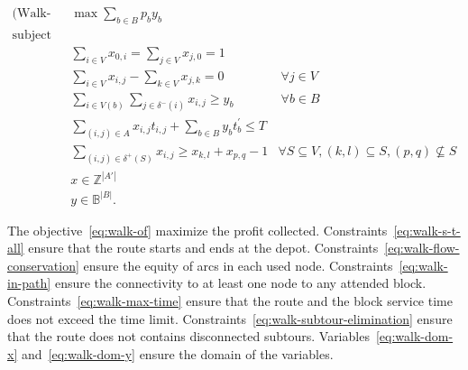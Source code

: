 \begin{align}
	\text{(Walk-CBRP) }          & \max \sum_{b \in B} p_b y_{b}                                             & \label{eq:walk-of}                                                                                 \\
	\nonumber \text{subject to:} &                                                                           &                                                                                                    \\
	                             & \sum_{i \in V} x_{0,i} = \sum_{j \in V} x_{j,0} = 1                       & \label{eq:walk-s-t-all}                                                                            \\
	                             & \sum_{i \in V} x_{i,j} - \sum_{k \in V} x_{j,k} = 0                       & \ \forall j \in V \label{eq:walk-flow-conservation}                                                \\
	                             & \sum_{i \in V(b)} \sum_{j \in \delta^{-}(i)} x_{i,j} \geq y_{b}           & \ \forall b \in B \label{eq:walk-in-path}                                                          \\
	                             & \sum_{(i, j) \in A} x_{i,j}t_{i,j} + \sum_{b \in B} y_{b}t^{'}_{b} \leq T & \label{eq:walk-max-time}                                                                           \\
	                             & \sum_{(i, j) \in \delta^{+}(S)} x_{i,j} \geq x_{k,l} + x_{p,q} - 1        & \forall S \subseteq V, (k, l) \subseteq S, (p, q) \nsubseteq S \label{eq:walk-subtour-elimination} \\
	                             & x \in \mathbb{Z}^{|A'|}                                                   & \label{eq:walk-dom-x}                                                                              \\
	                             & y \in \mathbb{B}^{|B|}.                                                   & \label{eq:walk-dom-y}
\end{align}

The objective~\eqref{eq:walk-of} maximize the profit collected.
Constraints~\eqref{eq:walk-s-t-all} ensure that the route starts and ends at the
depot. Constraints~\eqref{eq:walk-flow-conservation} ensure the equity of arcs
in each used node. Constraints~\eqref{eq:walk-in-path} ensure the connectivity
to at least one node to any attended block. Constraints~\eqref{eq:walk-max-time}
ensure that the route and the block service time does not exceed the time limit.
Constraints~\eqref{eq:walk-subtour-elimination} ensure that the route does not
contains disconnected subtours. Variables~\eqref{eq:walk-dom-x}
and~\eqref{eq:walk-dom-y} ensure the domain of the variables.

